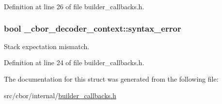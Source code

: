 Definition at line 26 of file builder\-\_\-callbacks.\-h.

\hypertarget{struct__cbor__decoder__context_ae34e7cc9b435a63bc0e92c425279db84}{
\subsubsection[{syntax\-\_\-error}]{\setlength{\rightskip}{0pt plus 5cm}bool \-\_\-cbor\-\_\-decoder\-\_\-context\-::syntax\-\_\-error}}\label{struct__cbor__decoder__context_ae34e7cc9b435a63bc0e92c425279db84}


Stack expectation mismatch. 



Definition at line 24 of file builder\-\_\-callbacks.\-h.



The documentation for this struct was generated from the following file\-:\begin{DoxyCompactItemize}
\item 
src/cbor/internal/\hyperlink{builder__callbacks_8h}{builder\-\_\-callbacks.\-h}\end{DoxyCompactItemize}
